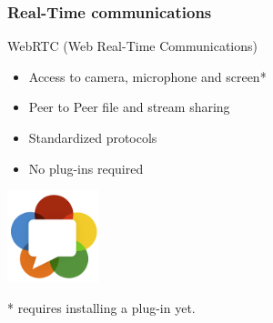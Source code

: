 \documentclass[compress]{beamer}
\begin{document}
		\begin{frame}[c]
		\frametitle{Real-Time communications}

		WebRTC (Web Real-Time Communications)

		\begin{itemize}
		\item Access to camera, microphone and screen*
		\item Peer to Peer file and stream sharing
		\item Standardized protocols
		\item No plug-ins required
		\end{itemize}

		\begin{flushright}

			\vspace*{-5\baselineskip}
			\includegraphics[width=0.2\textwidth]{figures/webrtc.png}
		\end{flushright}
		
			\tiny{* requires installing a plug-in yet.}

		\end{frame}
\end{document}
